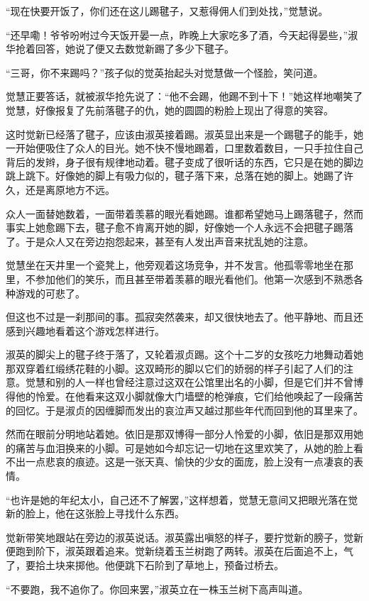 \par “现在快要开饭了，你们还在这儿踢毽子，又惹得佣人们到处找，”觉慧说。
\par “还早嘞！爷爷吩咐过今天饭开晏一点，昨晚上大家吃多了酒，今天起得晏些，”淑华抢着回答，她说了便又去数觉新踢了多少下毽子。
\par “三哥，你不来踢吗？”孩子似的觉英抬起头对觉慧做一个怪脸，笑问道。
\par 觉慧正要答话，就被淑华抢先说了：“他不会踢，他踢不到十下！”她这样地嘲笑了觉慧，好像报复了先前落毽子的仇，她的圆圆的粉脸上现出了得意的笑容。
\par 这时觉新已经落了毽子，应该由淑英接着踢。淑英显出来是一个踢毽子的能手，她一开始便吸住了众人的目光。她不快不慢地踢着，口里数着数目，一只手拉住自己背后的发辫，身子很有规律地动着。毽子变成了很听话的东西，它只是在她的脚边跳上跳下。好像她的脚上有吸力似的，毽子落下来，总落在她的脚上。她踢了许久，还是离原地方不远。
\par 众人一面替她数着，一面带着羡慕的眼光看她踢。谁都希望她马上踢落毽子，然而事实上她愈踢下去，毽子愈不肯离开她的脚，好像她一个人永远不会把毽子踢落了。于是众人又在旁边抱怨起来，甚至有人发出声音来扰乱她的注意。
\par 觉慧坐在天井里一个瓷凳上，他旁观着这场竞争，并不发言。他孤零零地坐在那里，不参加他们的笑乐，而且甚至带着羡慕的眼光看他们。他第一次感到不熟悉各种游戏的可悲了。
\par 但这也不过是一刹那间的事。孤寂突然袭来，却又很快地去了。他平静地、而且还感到兴趣地看着这个游戏怎样进行。
\par 淑英的脚尖上的毽子终于落了，又轮着淑贞踢。这个十二岁的女孩吃力地舞动着她那双穿着红缎绣花鞋的小脚。这双畸形的脚以它们的娇弱的样子引起了人们的注意。觉慧和别的人一样也曾经注意过这双在公馆里出名的小脚，但是它们并不曾博得他的怜爱。在他看来这双小脚就像大门墙壁的枪弹痕，它们给他唤起了一段痛苦的回忆。于是淑贞的因缠脚而发出的哀泣声又越过那些年代而回到他的耳里来了。
\par 然而在眼前分明地站着她。依旧是那双博得一部分人怜爱的小脚，依旧是那双用她的痛苦与血泪换来的小脚。可是她如今却忘记一切地在这里欢笑了，从她的脸上看不出一点悲哀的痕迹。这是一张天真、愉快的少女的面庞，脸上没有一点凄哀的表情。
\par “也许是她的年纪太小，自己还不了解罢，”这样想着，觉慧无意间又把眼光落在觉新的脸上，他在这张脸上寻找什么东西。
\par 觉新带笑地跟站在旁边的淑英说话。淑英露出嗔怒的样子，要拧觉新的膀子，觉新便跑到阶下，淑英跟着追来。觉新绕着玉兰树跑了两转。淑英在后面追不上，气了，要拾土块来掷他。他便跳下石阶到了草地上，预备过桥去。
\par “不要跑，我不追你了。你回来罢，”淑英立在一株玉兰树下高声叫道。
